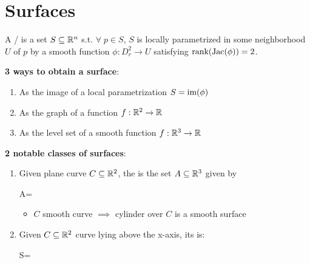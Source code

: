 \documentclass[13pt]{extarticle}
\begin{document}
\pagebreak
\section{Surfaces}
\begin{tcolorbox}[colback=white]
    \begin{definition}
        A / is a set $S\subseteq\mathbb{R}^n$ s.t. $\forall\;p\in S$, $S$ is locally parametrized in some neighborhood $U$ of $p$ by a smooth function $\phi:D_r^2\to U$ satisfying $\text{rank}(\text{Jac}(\phi))=2$.
    \end{definition}
\end{tcolorbox}

\pstart
\textbf{3 ways to obtain a surface}: \begin{enumerate}
    \item As the image of a local parametrization $S=\text{im}(\phi)$
    \item As the graph of a function $f:\mathbb{R}^2\to\mathbb{R}$
    \item As the level set of a smooth function $f:\mathbb{R}^3\to\mathbb{R}$
\end{enumerate}

\newp
\textbf{2 notable classes of surfaces}: \begin{enumerate}
    \item Given plane curve $C\subseteq\mathbb{R}^2$, the  is the set $A\subseteq\mathbb{R}^3$ given by \begin{eqnbox}
        A=
    \end{eqnbox} \begin{itemize}
        \item $C$ smooth curve $\implies$ cylinder over $C$ is a smooth surface
    \end{itemize}
    \item Given $C\subseteq\mathbb{R}^2$ curve lying above the x-axis, its  is: \begin{eqnbox}
        S=
    \end{eqnbox}
\end{enumerate}

\newp
\end{document}
